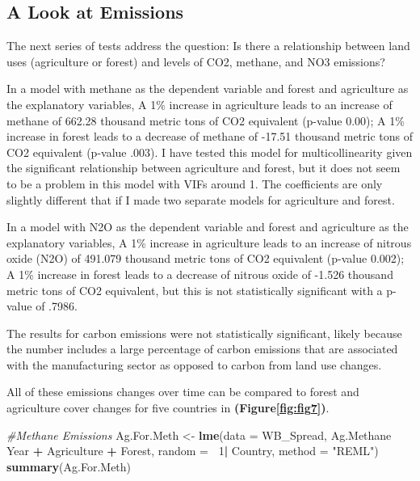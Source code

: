 \documentclass[12pt,]{article}
\newenvironment{Shaded}{\begin{snugshade}}{\end{snugshade}}
\newcommand{\KeywordTok}[1]{\textcolor[rgb]{0.13,0.29,0.53}{\textbf{#1}}}
\newcommand{\DataTypeTok}[1]{\textcolor[rgb]{0.13,0.29,0.53}{#1}}
\newcommand{\DecValTok}[1]{\textcolor[rgb]{0.00,0.00,0.81}{#1}}
\newcommand{\StringTok}[1]{\textcolor[rgb]{0.31,0.60,0.02}{#1}}
\newcommand{\CommentTok}[1]{\textcolor[rgb]{0.56,0.35,0.01}{\textit{#1}}}
\newcommand{\OperatorTok}[1]{\textcolor[rgb]{0.81,0.36,0.00}{\textbf{#1}}}
\newcommand{\NormalTok}[1]{#1}
\begin{document}
\subsection{A Look at Emissions}\label{a-look-at-emissions}

The next series of tests address the question: Is there a relationship
between land uses (agriculture or forest) and levels of CO2, methane,
and NO3 emissions?

In a model with methane as the dependent variable and forest and
agriculture as the explanatory variables, A 1\% increase in agriculture
leads to an increase of methane of 662.28 thousand metric tons of CO2
equivalent (p-value 0.00); A 1\% increase in forest leads to a decrease
of methane of -17.51 thousand metric tons of CO2 equivalent (p-value
.003). I have tested this model for multicollinearity given the
significant relationship between agriculture and forest, but it does not
seem to be a problem in this model with VIFs around 1. The coefficients
are only slightly different that if I made two separate models for
agriculture and forest.

In a model with N2O as the dependent variable and forest and agriculture
as the explanatory variables, A 1\% increase in agriculture leads to an
increase of nitrous oxide (N2O) of 491.079 thousand metric tons of CO2
equivalent (p-value 0.002); A 1\% increase in forest leads to a decrease
of nitrous oxide of -1.526 thousand metric tons of CO2 equivalent, but
this is not statistically significant with a p-value of .7986.

The results for carbon emissions were not statistically significant,
likely because the number includes a large percentage of carbon
emissions that are associated with the manufacturing sector as opposed
to carbon from land use changes.

All of these emissions changes over time can be compared to forest and
agriculture cover changes for five countries in
\textbf{(Figure\ref{fig:fig7})}.

\begin{Shaded}
\begin{Highlighting}[]
\CommentTok{#Methane Emissions}
\NormalTok{Ag.For.Meth <-}\StringTok{ }\KeywordTok{lme}\NormalTok{(}\DataTypeTok{data =}\NormalTok{ WB_Spread,}
\NormalTok{                 Ag.Methane }\OperatorTok{~}\StringTok{ }\NormalTok{Year }\OperatorTok{+}\StringTok{ }\NormalTok{Agriculture }\OperatorTok{+}\StringTok{ }\NormalTok{Forest,}
                 \DataTypeTok{random =} \OperatorTok{~}\DecValTok{1}\OperatorTok{|}\StringTok{ }\NormalTok{Country,}
                 \DataTypeTok{method =} \StringTok{"REML"}\NormalTok{)}
\KeywordTok{summary}\NormalTok{(Ag.For.Meth)}
\end{Highlighting}
\end{Shaded}
\end{document}
